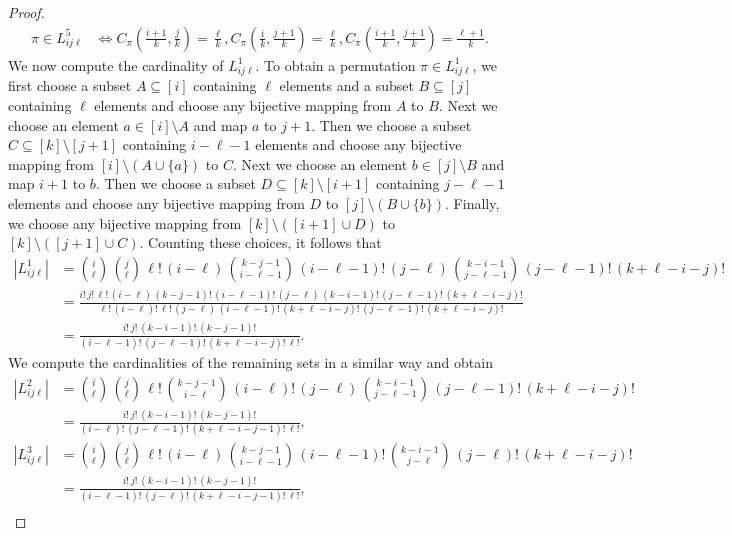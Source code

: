 \documentclass[10pt,a4paper]{amsart}
\begin{document}
\begin{proof}
\begin{align*}
   \pi \in L_{ij\ell}^5 &\Leftrightarrow C_\pi(\tfrac{i+1}{k},\tfrac{j}{k}) = \tfrac{\ell}{k},  C_\pi(\tfrac{i}{k},\tfrac{j+1}{k}) = \tfrac{\ell}{k},  C_\pi(\tfrac{i+1}{k},\tfrac{j+1}{k}) = \tfrac{\ell+1}{k}.
\end{align*}
We now compute the cardinality of $ L_{ij\ell}^1$.
To obtain a permutation $\pi\in L_{ij\ell}^1$, we first choose a subset $A \subseteq [i]$ containing $\ell$ elements and a subset $B \subseteq [j]$ containing $\ell$ elements and choose any bijective mapping from $A$ to $B$. Next we choose an element $a \in [i] \setminus A$ and map $a$ to $j+1$. Then we choose a subset $C \subseteq [k]\setminus [j+1]$ containing $i-\ell-1$ elements and choose any bijective mapping from $[i]\setminus (A\cup\{a\})$ to $C$. Next we choose an element $b \in [j] \setminus B$ and map $i+1$ to $b$. Then we choose a subset $D \subseteq [k]\setminus [i+1]$ containing $j-\ell-1$ elements and choose any bijective mapping from $D$ to $[j]\setminus (B\cup\{b\})$. Finally, we choose any bijective mapping from $[k]\setminus([i+1]\cup D)$ to $[k]\setminus([j+1]\cup C)$. Counting these choices, it follows that 
\begin{align*}
   |L_{ij\ell}^1| &= \binom{i}{\ell} \, \binom{j}{\ell} \, \ell! \, (i-\ell) \, \binom{k-j-1}{i-\ell-1} \, (i-\ell-1)! \, (j-\ell) \, \binom{k-i-1}{j-\ell-1} \, (j-\ell-1)! \,(k+\ell-i-j)! \\ 
   &= \frac{i! \,j! \, \ell!\, (i-\ell) \, (k-j-1)! \,(i-\ell-1)! \,(j-\ell) \, (k-i-1)! \,(j-\ell-1)! \, (k+\ell-i-j)!}{\ell! \, (i-\ell)! \, \ell! \, (j-\ell) \, (i-\ell-1)! \, (k+\ell-i-j)! \, (j-\ell-1)! \, (k+\ell-i-j)!} \\
   &= \frac{i! \, j! \, (k-i-1)! \, (k-j-1)!}{(i-\ell-1)! \, (j-\ell-1)! \, (k+\ell-i-j)! \, \ell!}. 
\end{align*}
We compute the cardinalities of the remaining sets in a similar way and obtain
\begin{align*}
   |L_{ij\ell}^2| &= \binom{i}{\ell} \, \binom{j}{\ell} \, \ell! \, \binom{k-j-1}{i-\ell} \, (i-\ell)! \, (j-\ell) \, \binom{k-i-1}{j-\ell-1} \, (j-\ell-1)! \,(k+\ell-i-j)! \\ 
   &= \frac{i! \, j! \, (k-i-1)! \, (k-j-1)!}{(i-\ell)! \, (j-\ell-1)! \, (k+\ell-i-j-1)! \, \ell!}, \\ 
   |L_{ij\ell}^3| &= \binom{i}{\ell} \, \binom{j}{\ell} \, \ell! \, (i-\ell) \, \binom{k-j-1}{i-\ell-1} \, (i-\ell-1)! \, \binom{k-i-1}{j-\ell} \, (j-\ell)! \,(k+\ell-i-j)! \\ 
   &= \frac{i! \, j! \, (k-i-1)! \, (k-j-1)!}{(i-\ell-1)! \, (j-\ell)! \, (k+\ell-i-j-1)! \, \ell!}, \\ 

\end{align*}
\end{proof}
\end{document}
